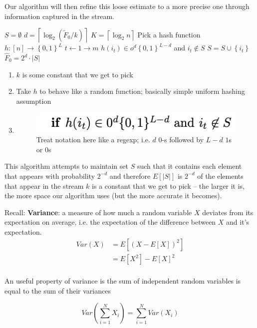 \documentclass[../notes.tex]{subfiles}
\begin{document}
Our algorithm will then refine this loose estimate to a more precise one through information captured in the stream.

\begin{codebox}
\li $ S = \emptyset $
\li $ d = \left\lceil \log_2 (\tilde{F}_0/k) \right\rceil  $
\li $ K = \left\lceil \log_2 n \right\rceil  $
\li Pick a hash function $ h : [n] \to  \left\{ 0,1 \right\} ^L $
\li \For $ t \gets 1 \to m $ \Do 
\li     \If $ h(i_t) \in o^d \left\{ 0,1 \right\} ^{L-d} $ and $ i_t \notin S $ \Then
\li         $ S = S \cup \left\{ i_t \right\}  $ \End \End
\li \Return $ \hat{F}_0 = 2^d \cdot  |S| $
\end{codebox}

\begin{enumerate}
    \item {} $ k $ is some constant that we get to pick
    \item Take $ h $ to behave like a random function; basically simple uniform hashing assumption
    \item 
        \begin{figure}[H]
            \centering
            \includegraphics[width=0.4\linewidth]{img/image_2023-02-10-12-37-38.png}
            \caption{Treat notation here like a regexp; i.e. $ d  $ $ 0 $-s followed by $ L-d $ $ 1 $s or $ 0 $s}
        \end{figure}
\end{enumerate}

This algorithm attempts to maintain set $ S  $ such that it contains each element that appears with probability $ 2^{-d} $ and therefore $ E[|S|] $ is $ 2^{-d} $ of the elements that appear in the stream
$ k $ is a constant that we get to pick -- the larger it is, the more space our algorithm uses (but the more accurate it becomes).




\begin{definition}
    Recall: \textbf{Variance}: a measure of how much a random variable $ X $ deviates from its expectation on average, i.e. the expectation of the difference between $ X $ and it's expectation.
    \begin{equation}
        \begin{split}
            Var(X) &=  E[(X - E[X])^2] \\
                   &= E[X^2] - E[X]^2  \\
        \end{split}
    \end{equation}

    An useful property of variance is the sum of independent random variables is equal to the sum of their variances

    \begin{equation}
        Var(\sum_{i=1}^{N} X_i ) = \sum_{i=1}^{N} Var(X_i)
    \end{equation}
\end{definition}
\end{document}
